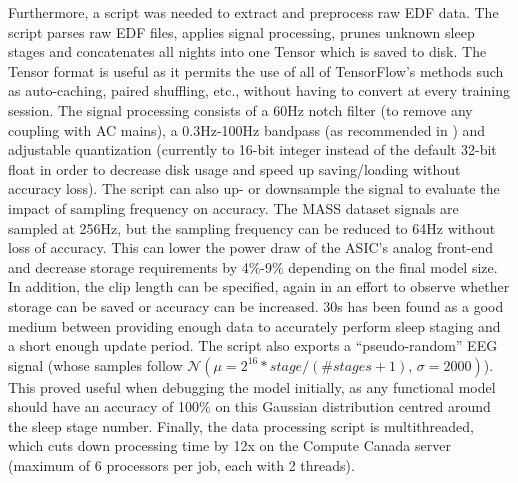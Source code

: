 \documentclass[12pt, hidelinks]{article}
\begin{document}
    Furthermore, a script was needed to extract and preprocess raw EDF data. The script parses raw EDF files, applies signal processing, prunes unknown sleep stages and concatenates all nights into one Tensor which is saved to disk. The Tensor format is useful as it permits
    the use of all of TensorFlow's methods such as auto-caching, paired shuffling, etc., without having to convert at every training session. The signal processing consists of a 60Hz notch filter (to remove any coupling with AC mains), a 0.3Hz-100Hz bandpass (as recommended
    in \cite{supratak2017deepsleepnet}) and adjustable quantization (currently to 16-bit integer instead of the default 32-bit float in order to decrease disk usage and speed up saving/loading without accuracy loss). The script can also up- or downsample the signal to evaluate the
    impact of sampling frequency on accuracy. The MASS dataset signals are sampled at 256Hz, but the sampling frequency can be reduced to 64Hz without loss of accuracy. This can lower the power draw of the ASIC's analog front-end and decrease storage requirements by 4\%-9\%
    depending on the final model size. In addition, the clip length can be specified, again in an effort to observe whether storage can be saved or accuracy can be increased. 30s has been found as a good medium between providing enough data to accurately perform sleep staging and
    a short enough update period. The script also exports a ``pseudo-random'' EEG signal (whose samples follow $\mathcal{N}(\mu=2^{16}*stage/{(\# stages+1)},\,\sigma=2000)$). This proved useful when debugging the model initially, as any functional model should have an accuracy of
    100\% on this Gaussian distribution centred around the sleep stage number. Finally, the data processing script is multithreaded, which cuts down processing time by 12x on the Compute Canada server (maximum of 6 processors per job, each with 2 threads).
\end{document}
